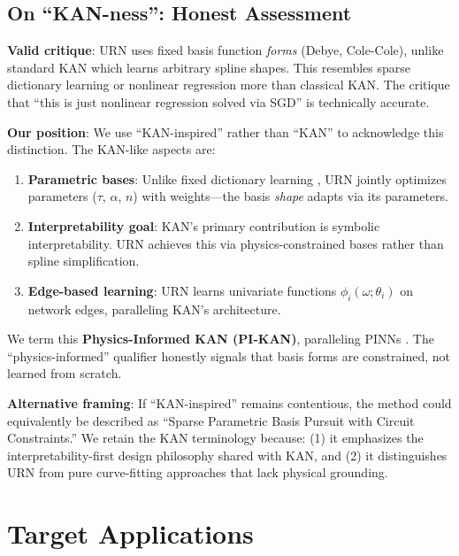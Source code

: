 \documentclass{ieeeaccess}
\begin{document}
\subsection{On ``KAN-ness'': Honest Assessment}
\label{sec:kan_terminology}

\textbf{Valid critique}: URN uses fixed basis function \textit{forms} (Debye, Cole-Cole), unlike standard KAN which learns arbitrary spline shapes. This resembles sparse dictionary learning or nonlinear regression more than classical KAN. The critique that ``this is just nonlinear regression solved via SGD'' is technically accurate.

\textbf{Our position}: We use ``KAN-inspired'' rather than ``KAN'' to acknowledge this distinction. The KAN-like aspects are:
\begin{enumerate}
\item \textbf{Parametric bases}: Unlike fixed dictionary learning \cite{mairal2009online}, URN jointly optimizes parameters ($\tau$, $\alpha$, $n$) with weights---the basis \textit{shape} adapts via its parameters.
\item \textbf{Interpretability goal}: KAN's primary contribution is symbolic interpretability. URN achieves this via physics-constrained bases rather than spline simplification.
\item \textbf{Edge-based learning}: URN learns univariate functions $\phi_i(\omega; \theta_i)$ on network edges, paralleling KAN's architecture.
\end{enumerate}

We term this \textbf{Physics-Informed KAN (PI-KAN)}, paralleling PINNs \cite{raissi2019physics}. The ``physics-informed'' qualifier honestly signals that basis forms are constrained, not learned from scratch.

\textbf{Alternative framing}: If ``KAN-inspired'' remains contentious, the method could equivalently be described as ``Sparse Parametric Basis Pursuit with Circuit Constraints.'' We retain the KAN terminology because: (1) it emphasizes the interpretability-first design philosophy shared with KAN, and (2) it distinguishes URN from pure curve-fitting approaches that lack physical grounding.

\section{Target Applications}
\label{sec:discussion}
\end{document}

